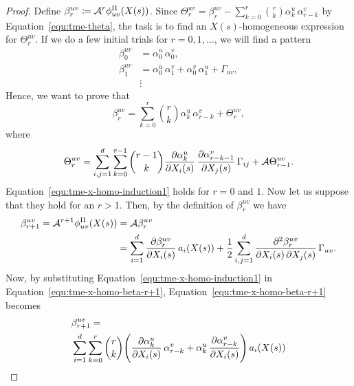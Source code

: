 \begin{proof}
	Define $\beta_r^{uv} \coloneqq \mathcal{A}^r \phi^{\mathrm{II}}_{uv}(X(s))$. Since $\Theta^{uv}_r = \beta^{uv}_r - \sum^r_{k=0}\binom{r}{k} \alpha^u_k \, \alpha^v_{r-k}$ by Equation~\eqref{equ:tme-theta}, the task is to find an $X(s)$-homogeneous expression for $\Theta^{uv}_r$. If we do a few initial trials for $r=0,1,\ldots$, we will find a pattern
	\begin{equation}
		\begin{split}
			\beta^{uv}_0 &= \alpha^u_0 \, \alpha^v_0, \\
			\beta^{uv}_1 &= \alpha^u_0 \, \alpha^v_1 + \alpha^v_0 \, \alpha^u_1 + \Gamma_{uv}, \\
			&\vdots
		\end{split}
	\end{equation}
	Hence, we want to prove that
	\begin{equation}
		\beta_r^{uv} = \sum^r_{k=0}\binom{r}{k} \alpha^u_k \, \alpha^v_{r-k} + \Theta_r^{uv},
		\label{equ:tme-x-homo-induction1}
	\end{equation}
	where 
	\begin{equation}
		\Theta_{r}^{uv} = \sum^d_{i,j=1} \sum^{r-1}_{k=0} \binom{r-1}{k} \frac{\partial \alpha^u_k}{\partial X_i(s)} \, \frac{\partial \alpha^v_{r-k-1}}{\partial X_j(s)} \, \Gamma_{ij} + \mathcal{A} \Theta_{r-1}^{uv}.
		\label{equ:tme-x-homo-induction2}
	\end{equation}
	Equation~\eqref{equ:tme-x-homo-induction1} holds for $r=0$ and $1$. Now let us suppose that they hold for an $r> 1$. Then, by the definition of $\beta^{uv}_r$ we have
	\begin{equation}
		\begin{split}
			\beta^{uv}_{r+1} = \mathcal{A}^{r+1} \phi^{\mathrm{II}}_{uv}(X(s)) &= \mathcal{A} \beta^{uv}_{r} \\
			&= \sum^d_{i=1} \frac{\partial \beta^{uv}_r}{\partial X_i(s)} \, a_i(X(s)) + \frac{1}{2} \sum^d_{i,j=1}\frac{\partial^2 \beta^{uv}_r}{\partial X_i(s) \, \partial X_j(s)} \, \Gamma_{uv}.
		\end{split}
		\label{equ:tme-x-homo-beta-r+1}
	\end{equation}
	Now, by substituting Equation~\eqref{equ:tme-x-homo-induction1} in Equation~\eqref{equ:tme-x-homo-beta-r+1},  Equation~\eqref{equ:tme-x-homo-beta-r+1} becomes
	\begin{align*}
		&\beta^{uv}_{r+1} = \\
		&\sum_{i=1}^d\sum^r_{k=0}\binom{r}{k}\Bigg(\tash{\alpha^u_k}{X_i(s)} \, \alpha^v_{r-k} + \alpha^u_k \, \tash{\alpha^v_{r-k}}{X_i(s)} \Bigg) \, a_i(X(s)) \\

\end{align*}
\end{proof}
